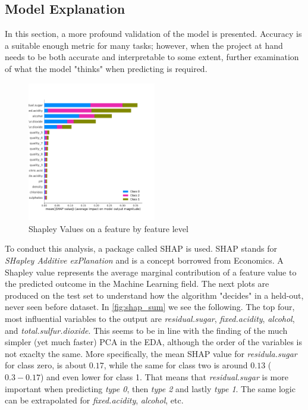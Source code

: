 \documentclass[11pt,twoside]{article}
\numberwithin{Theorem}{section}
\numberwithin{Definition}{section}
\numberwithin{Lemma}{section}
\numberwithin{Algorithm}{section}
\numberwithin{equation}{section}
\begin{document}
\subsection{Model Explanation}
\label{sec:explanation}
In this section, a more profound validation of the model is presented. Accuracy is a suitable enough metric for many tasks; however, when the project at hand needs to be both accurate and interpretable to some extent, further examination of what the model "thinks" when predicting is required.
\vspace*{1em}
\begin{figure}[!h]
\centering
\includegraphics[width=0.5\textwidth]{./output/2.i.shap-summary.pdf}
\caption{Shapley Values on a feature by feature level}
\label{fig:shap_sum}
\end{figure}
\vspace{2em}
To conduct this analysis, a package called \textsf{SHAP} is used. \textsf{SHAP} stands for \textit{SHapley Additive exPlanation} and is a concept borrowed from Economics. A Shapley value represents the average marginal contribution of a feature value to the predicted outcome in the Machine Learning field. The next plots are produced on the test set to understand how the algorithm "decides" in a held-out, never seen before dataset.
In \autoref{fig:shap_sum} we see the following. The top four, most influential variables to the output are \textit{residual.sugar}, \textit{fixed.acidity}, \textit{alcohol}, and \textit{total.sulfur.dioxide}. This seems to be in line with the finding of the much simpler (yet much faster) PCA in the EDA, although the order of the variables is not exaclty the same. More specifically, the mean SHAP value for \textit{residula.sugar} for class zero, is about $0.17$, while the same for class two is around $0.13$ ($0.3 - 0.17$) and even lower for class 1. That means that \textit{residual.sugar} is more important when predicting \textit{type 0}, then \textit{type 2} and lastly \textit{type 1}. The same logic can be extrapolated for \textit{fixed.acidity}, \textit{alcohol}, etc.
\end{document}
